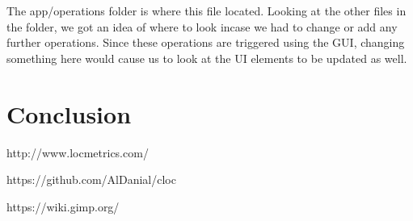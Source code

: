 The app/operations folder is where this file located. Looking at the other files in the folder, we got an idea of where to look incase we had to change or add any further operations. Since these operations are triggered using the GUI, changing something here would cause us to look at the UI elements to be updated as well.

\section{Conclusion}

\newpage
\begin{thebibliography}{9}
	http://www.locmetrics.com/
	
	https://github.com/AlDanial/cloc
	
	https://wiki.gimp.org/
	
	
	
\end{thebibliography}
